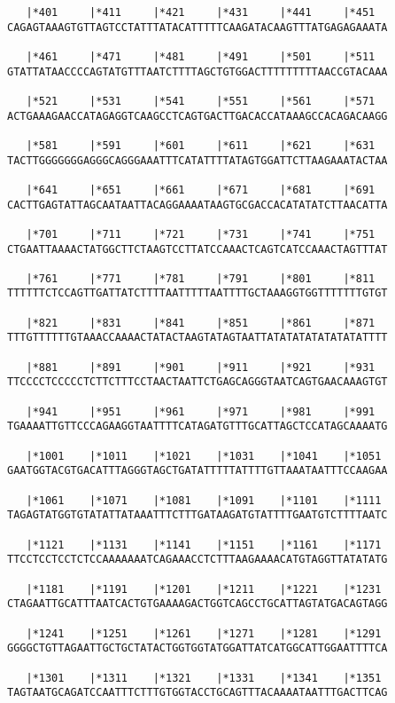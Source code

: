 \documentclass{article}
\begin{document}
\begin{Verbatim}
   |*401     |*411     |*421     |*431     |*441     |*451  
CAGAGTAAAGTGTTAGTCCTATTTATACATTTTTCAAGATACAAGTTTATGAGAGAAATA
  
   |*461     |*471     |*481     |*491     |*501     |*511  
GTATTATAACCCCAGTATGTTTAATCTTTTAGCTGTGGACTTTTTTTTTAACCGTACAAA
  
   |*521     |*531     |*541     |*551     |*561     |*571  
ACTGAAAGAACCATAGAGGTCAAGCCTCAGTGACTTGACACCATAAAGCCACAGACAAGG
  
   |*581     |*591     |*601     |*611     |*621     |*631  
TACTTGGGGGGGAGGGCAGGGAAATTTCATATTTTATAGTGGATTCTTAAGAAATACTAA
  
   |*641     |*651     |*661     |*671     |*681     |*691  
CACTTGAGTATTAGCAATAATTACAGGAAAATAAGTGCGACCACATATATCTTAACATTA
  
   |*701     |*711     |*721     |*731     |*741     |*751  
CTGAATTAAAACTATGGCTTCTAAGTCCTTATCCAAACTCAGTCATCCAAACTAGTTTAT
  
   |*761     |*771     |*781     |*791     |*801     |*811  
TTTTTTCTCCAGTTGATTATCTTTTAATTTTTAATTTTGCTAAAGGTGGTTTTTTTGTGT
  
   |*821     |*831     |*841     |*851     |*861     |*871  
TTTGTTTTTTGTAAACCAAAACTATACTAAGTATAGTAATTATATATATATATATATTTT
  
   |*881     |*891     |*901     |*911     |*921     |*931  
TTCCCCTCCCCCTCTTCTTTCCTAACTAATTCTGAGCAGGGTAATCAGTGAACAAAGTGT
  
   |*941     |*951     |*961     |*971     |*981     |*991  
TGAAAATTGTTCCCAGAAGGTAATTTTCATAGATGTTTGCATTAGCTCCATAGCAAAATG
  
   |*1001    |*1011    |*1021    |*1031    |*1041    |*1051 
GAATGGTACGTGACATTTAGGGTAGCTGATATTTTTATTTTGTTAAATAATTTCCAAGAA
  
   |*1061    |*1071    |*1081    |*1091    |*1101    |*1111 
TAGAGTATGGTGTATATTATAAATTTCTTTGATAAGATGTATTTTGAATGTCTTTTAATC
  
   |*1121    |*1131    |*1141    |*1151    |*1161    |*1171 
TTCCTCCTCCTCTCCAAAAAAATCAGAAACCTCTTTAAGAAAACATGTAGGTTATATATG
  
   |*1181    |*1191    |*1201    |*1211    |*1221    |*1231 
CTAGAATTGCATTTAATCACTGTGAAAAGACTGGTCAGCCTGCATTAGTATGACAGTAGG
  
   |*1241    |*1251    |*1261    |*1271    |*1281    |*1291 
GGGGCTGTTAGAATTGCTGCTATACTGGTGGTATGGATTATCATGGCATTGGAATTTTCA
  
   |*1301    |*1311    |*1321    |*1331    |*1341    |*1351 
TAGTAATGCAGATCCAATTTCTTTGTGGTACCTGCAGTTTACAAAATAATTTGACTTCAG
  

\end{Verbatim}
\end{document}
